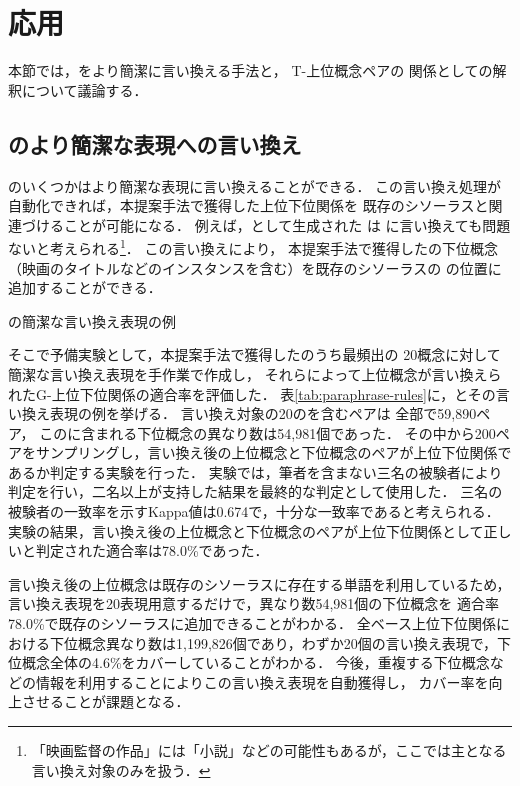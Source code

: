 \documentclass[japanese]{jnlp_1.4}
\newcommand{\ghype}{}
\newcommand{\xmp}[1]{}
\newcommand{\attval}[3]{}
\begin{document}
\section{応用 \label{sec:discussion}}

本節では，\ghype{}をより簡潔に言い換える手法と，
T-上位概念ペアの
\attval{対象}{属性}{属性値}関係としての解釈について議論する．

\subsection{\ghype{}のより簡潔な表現への言い換え}

\ghype{}のいくつかはより簡潔な表現に言い換えることができる．
この言い換え処理が自動化できれば，本提案手法で獲得した上位下位関係を
既存のシソーラスと関連づけることが可能になる．
例えば，\ghype{}として生成された
\xmp{映画監督の作品}は
\xmp{映画}に言い換えても問題ないと考えられる\footnote{「映画監督の作品」には「小説」などの可能性もあるが，ここでは主となる言い換え対象のみを扱う．}．
この言い換えにより，
本提案手法で獲得した\xmp{映画監督の作品}の下位概念
（映画のタイトルなどのインスタンスを含む）を既存のシソーラスの
\xmp{映画}の位置に追加することができる．

\begin{table}[b]
\caption{\ghype{}の簡潔な言い換え表現の例}
\label{tab:paraphrase-rules}

\end{table}

そこで予備実験として，本提案手法で獲得した\ghype{}のうち最頻出の
20概念に対して簡潔な言い換え表現を手作業で作成し，
それらによって上位概念が言い換えられたG-上位下位関係の適合率を評価した．
表\ref{tab:paraphrase-rules}に，\ghype{}とその言い換え表現の例を挙げる．
言い換え対象の20の\ghype{}を含む\ghype{}ペアは
全部で59,890ペア，
この\ghype{}に含まれる下位概念の異なり数は54,981個であった．
その中から200ペアをサンプリングし，言い換え後の上位概念と下位概念のペアが上位下位関係であるか判定する実験を行った．
実験では，筆者を含まない三名の被験者により判定を行い，二名以上が支持した結果を最終的な判定として使用した．
三名の被験者の一致率を示すKappa値は0.674で，十分な一致率であると考えられる．
実験の結果，言い換え後の上位概念と下位概念のペアが上位下位関係として正しいと判定された適合率は78.0\%であった．

言い換え後の上位概念は既存のシソーラスに存在する単語を利用しているため，言い換え表現を20表現用意するだけで，異なり数54,981個の下位概念を
適合率78.0\%で既存のシソーラスに追加できることがわかる．
全ベース上位下位関係における下位概念異なり数は1,199,826個であり，わずか20個の言い換え表現で，下位概念全体の4.6\%をカバーしていることがわかる．
今後，重複する下位概念などの情報を利用することによりこの言い換え表現を自動獲得し，
カバー率を向上させることが課題となる．
\end{document}

